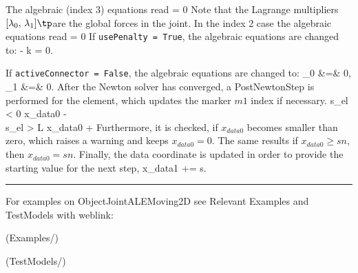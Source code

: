     The algebraic (index 3) equations read
    \be
       = 0
    \ee
    Note that the Lagrange multipliers $[\lambda_0,\,\lambda_1]\tp$are the global forces in the joint.
    In the index 2 case the algebraic equations read
    \be
       = 0
    \ee
    If \texttt{usePenalty = True}, the algebraic equations are changed to:
    \be
       -  k \zv = 0.
    \ee
%

    \noindent If \texttt{activeConnector = False}, the algebraic equations are changed to:
    \bea
      \lambda_0 &=& 0,   \\
      \lambda_1 &=& 0.
    \eea   
%
    After the Newton solver has converged, a PostNewtonStep is performed for the element, which
    updates the marker $m1$ index if necessary.
    \bea
      s_{el} < 0 \quad \ra \quad x_{data0} \;-\! \nonumber\\
      s_{el} > L \quad \ra \quad x_{data0} \;+\!
    \eea
    Furthermore, it is checked, if $x_{data0}$ becomes smaller than zero, which raises a warning and keeps $x_{data0}=0$.
    The same results if $x_{data0}\ge sn$, then $x_{data0} = sn$.
    Finally, the data coordinate is updated in order to provide the starting value for the next step,
    \be
      x_{data1} \;+\!\!= s.
    \ee
%
\vspace{6pt}\par\noindent\rule{\textwidth}{0.4pt}
%
\noindent For examples on ObjectJointALEMoving2D see Relevant Examples and TestModels with weblink:
\bi
\item {} (Examples/)
\item {} (TestModels/)

